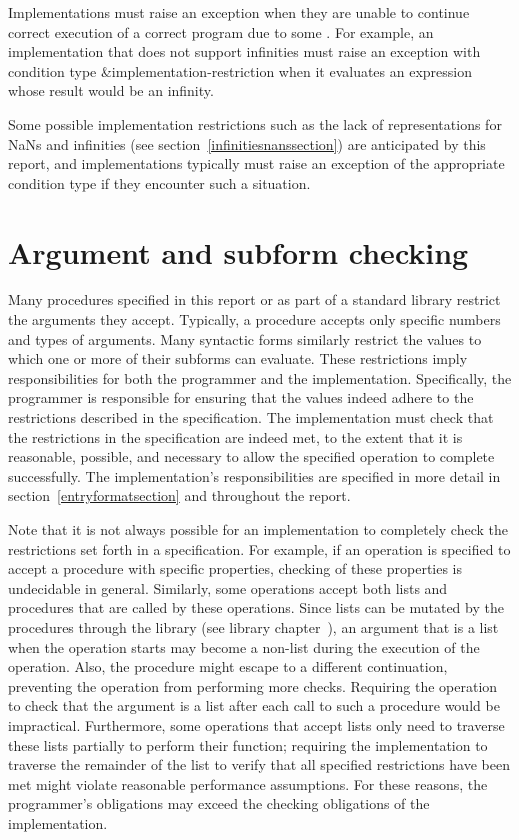 Implementations must raise an exception
when they are unable to continue correct execution
of a correct program due to some .  For
example, an implementation that does not support infinities
must raise an exception with condition type
{\cf\&implementation-restriction} when it evaluates an expression
whose result would be an infinity.

Some possible implementation restrictions such as the lack of
representations for NaNs and infinities (see
section~\ref{infinitiesnanssection}) are anticipated by this report,
and implementations typically must raise an exception of the
appropriate condition type if they encounter such a situation.

\section{Argument and subform checking}
\label{argumentcheckingsection}

Many procedures specified in this report or as part of a
standard library restrict the arguments they accept.
Typically, a procedure accepts only specific numbers and types of arguments.
Many syntactic forms similarly restrict the values to which one or
more of their subforms can evaluate.
These restrictions imply responsibilities for
both the programmer and the implementation.
Specifically, the programmer is responsible for ensuring
that the values indeed adhere to the restrictions described
in the specification.  The implementation must check
that the restrictions in the specification are indeed met, to the
extent that it is reasonable, possible, and necessary to allow the
specified operation to complete successfully.  The implementation's
responsibilities are specified in more detail in
section~\ref{entryformatsection} and throughout the report.

Note that it is not always possible for an implementation to completely check
the restrictions set forth in a specification.  For example, if an
operation is specified to accept a procedure with specific properties,
checking of these properties is undecidable in general.  Similarly,
some operations accept both lists and procedures that are
called by these operations.  Since lists can be mutated by the procedures
through the  library (see library
chapter~), an argument that is a list
when the operation starts may become a non-list during the execution of the operation.
Also, the procedure might escape to a different continuation,
preventing the operation from performing more checks.
Requiring the operation to check that the argument is a list after
each call to such a procedure would be impractical.  Furthermore, some
operations that accept lists only need to traverse these lists
partially to perform their function; requiring the implementation to
traverse the remainder of the list to verify that all specified
restrictions have been met might
violate reasonable performance assumptions.  For these reasons, the
programmer's obligations may exceed the checking obligations of the
implementation.


